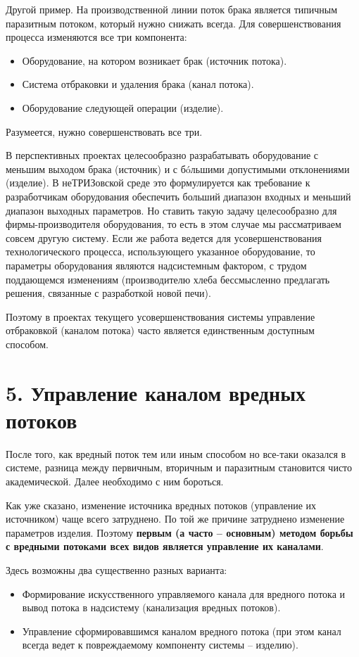 \documentclass[a4paper,11pt]{article}
\begin{document}
Другой пример. На производственной линии поток брака является типичным
паразитным потоком, который нужно снижать всегда. Для совершенствования
процесса изменяются все три компонента:
\begin{itemize}
\item Оборудование, на котором возникает брак (источник потока).
\item Система отбраковки и удаления брака (канал потока).
\item Оборудование следующей операции (изделие).
\end{itemize}
Разумеется, нужно совершенствовать все три.

В перспективных проектах целесообразно разрабатывать оборудование с меньшим
выходом брака (источник) и с бóльшими допустимыми отклонениями (изделие). В
неТРИЗовской среде это формулируется как требование к разработчикам
оборудования обеспечить больший диапазон входных и меньший диапазон выходных
параметров. Но ставить такую задачу целесообразно для фирмы-производителя
оборудования, то есть в этом случае мы рассматриваем совсем другую систему.
Если же работа ведется для усовершенствования технологического процесса,
использующего указанное оборудование, то параметры оборудования являются
надсистемным фактором, с трудом поддающемся изменениям (производителю хлеба
бессмысленно предлагать решения, связанные с разработкой новой печи).

Поэтому в проектах текущего усовершенствования системы управление отбраковкой
(каналом потока) часто является единственным доступным способом.

\section{5. Управление каналом вредных потоков}

После того, как вредный поток тем или иным способом но все-таки оказался в
системе, разница между первичным, вторичным и паразитным становится чисто
академической. Далее необходимо с ним бороться.

Как уже сказано, изменение источника вредных потоков (управление их
источником) чаще всего затруднено. По той же причине затруднено изменение
параметров изделия. Поэтому \textbf{первым (а часто -- основным) методом
  борьбы с вредными потоками всех видов является управление их каналами}.

Здесь возможны два существенно разных варианта:
\begin{itemize}
\item Формирование искусственного управляемого канала для вредного потока и
  вывод потока в надсистему (канализация вредных потоков).
\item Управление сформировавшимся каналом вредного потока (при этом канал
  всегда ведет к повреждаемому компоненту системы -- изделию).
\end{itemize}
\end{document}
